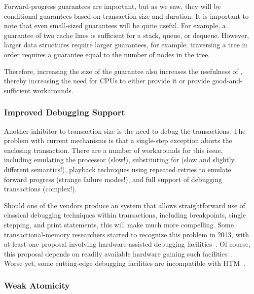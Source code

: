 Forward-progress guarantees are important, but as we saw, they will
be conditional guarantees based on transaction size and duration.
It is important to note that even small-sized guarantees will be
quite useful.
For example,
a guarantee of two cache lines is sufficient for a stack, queue, or dequeue.
However, larger data structures require larger guarantees, for example,
traversing a tree in order requires a guarantee equal to the number
of nodes in the tree.

Therefore, increasing the size of the guarantee also increases the
usefulness of , thereby increasing the need for CPUs to either
provide it or provide good-and-sufficient workarounds.

\subsubsection{Improved Debugging Support}
\label{sec:future:Improved Debugging Support}

Another inhibitor to transaction size is the need to debug the transactions.
The problem with current mechanisms is that a single-step exception
aborts the enclosing transaction.
There are a number of workarounds for this issue, including emulating
the processor (slow!), substituting  for  (slow and slightly
different semantics!),
playback techniques using repeated retries to emulate forward
progress (strange failure modes!), and
full support of debugging  transactions (complex!).

Should one of the  vendors produce an  system that allows
straightforward use of classical debugging techniques within
transactions, including breakpoints, single stepping, and
print statements, this will make  much more compelling.
Some transactional-memory researchers started to recognize this
problem in 2013, with at least one proposal involving hardware-assisted
debugging facilities~\cite{JustinGottschlich2013TMdebug}.
Of course, this proposal depends on readily available hardware gaining such
facilities~\cite{TimothyHayes2020ARM-HTM,Intel2020TSXdevguide}.
Worse yet, some cutting-edge debugging facilities are incompatible
with HTM~\cite{10.1145/3387945.3391621}.

\subsubsection{Weak Atomicity}
\label{sec:future:Weak Atomicity}

